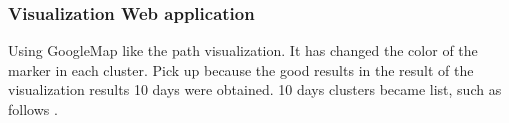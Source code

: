 
\subsubsection{Visualization Web application}
Using GoogleMap like the path visualization. It has changed the color of the marker in each cluster.
Pick up because the good results in the result of the visualization results 10 days were obtained. 10 days clusters became list, such as follows .

